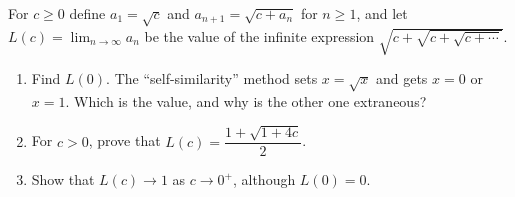 For $c\ge0$ define $a_1=\sqrt c$ and $a_{n+1}=\sqrt{c+a_n}$ for $n\ge1$, and let $L(c)=\displaystyle\lim_{n\to\infty}a_n$ be the value of the infinite expression $\sqrt{c+\sqrt{c+\sqrt{c+\cdots}}}$.
\begin{enumerate}
\item[(a)] Find $L(0)$. The ``self-similarity'' method sets $x=\sqrt x$ and gets $x=0$ or $x=1$. Which is the value, and why is the other one extraneous?
\item[(b)] For $c>0$, prove that $L(c)=\dfrac{1+\sqrt{1+4c}}{2}$.
\item[(c)] Show that $L(c)\to1$ as $c\to0^+$, although $L(0)=0$.
\end{enumerate}
